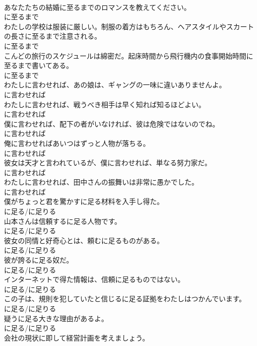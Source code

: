 \documentclass[8pt]{extreport}
\begin{document}
\begin{CJK}{UTF8}{min}
\\	あなたたちの結婚に至るまでのロマンスを教えてください。	
\\	に至るまで
\\	わたしの学校は服装に厳しい。制服の着方はもちろん、ヘアスタイルやスカートの長さに至るまで注意される。	
\\	に至るまで
\\	こんどの旅行のスケジュールは綿密だ。起床時間から飛行機内の食事開始時間に至るまで書いてある。	
\\	に至るまで
\\	わたしに言わせれば、あの娘は、ギャングの一味に違いありませんよ。	
\\	に言わせれば
\\	わたしに言わせれば、戦うべき相手は早く知れば知るほどよい。	
\\	に言わせれば
\\	僕に言わせれば、配下の者がいなければ、彼は危険ではないのでね。	
\\	に言わせれば
\\	俺に言わせればあいつはずっと人物が落ちる。	
\\	に言わせれば
\\	彼女は天才と言われているが、僕に言わせれば、単なる努力家だ。	
\\	に言わせれば
\\	わたしに言わせれば、田中さんの振舞いは非常に愚かでした。	
\\	に言わせれば
\\	僕がちょっと君を驚かすに足る材料を入手し得た。	
\\	に足る/に足りる
\\	山本さんは信頼するに足る人物です。	
\\	に足る/に足りる
\\	彼女の同情と好奇心とは、頼むに足るものがある。	
\\	に足る/に足りる
\\	彼が誇るに足る奴だ。	
\\	に足る/に足りる
\\	インターネットで得た情報は、信頼に足るものではない。	
\\	に足る/に足りる
\\	この子は、規則を犯していたと信じるに足る証拠をわたしはつかんでいます。	
\\	に足る/に足りる
\\	疑うに足る大きな理由があるよ。	
\\	に足る/に足りる
\\	会社の現状に即して経営計画を考えましょう。	

\end{CJK}
\end{document}
